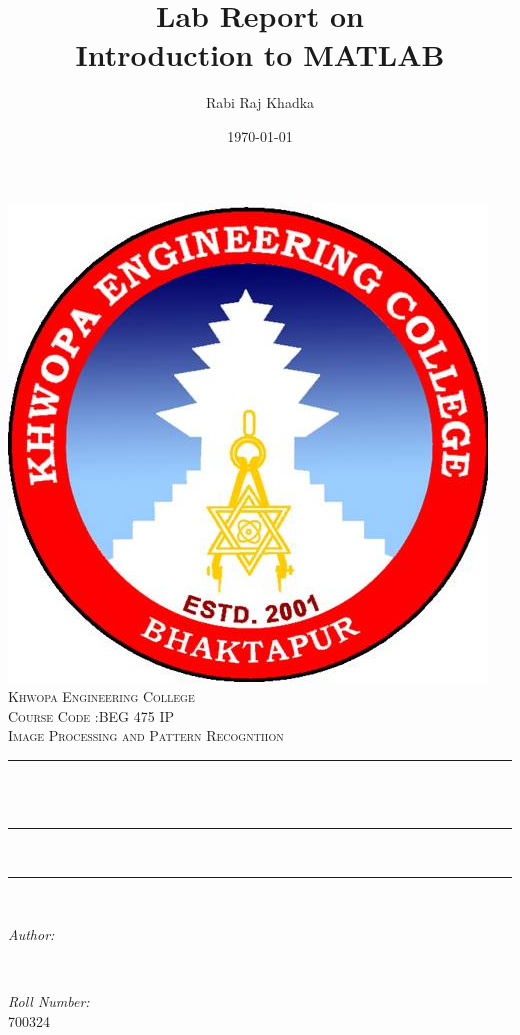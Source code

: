 \documentclass[12pt]{article}
\title{Lab Report on \\Introduction to MATLAB }								%
\author{Rabi Raj Khadka }								%
\date{\today}											%
\makeatletter
\let\thetitle\@title
\let\theauthor\@author
\let\thedate\@date
\makeatother
\begin{document}

\begin{titlepage}
	\centering
    \vspace*{0.2 cm}
    \includegraphics[scale = 0.3]{kheclogo.jpg}\\[1.0 cm]	%
    \textsc{\LARGE Khwopa Engineering College}\\[2.0 cm]	%
	\textsc{\Large Course Code :BEG 475 IP}\\[0.5 cm]				%
	\textsc{\large Image Processing and Pattern Recogntiion}\\[0.5 cm]				%
	\rule{\linewidth}{0.2 mm} \\[0.4 cm]
	{ \huge \bfseries \thetitle}\\
	\rule{\linewidth}{0.2 mm} \\[1.0 cm]
	
	\rule{\linewidth}{0 mm} \\[1.0 cm]

	\begin{minipage}{0.4\textwidth}
		\begin{flushleft} \large
			\emph{Author:}\\
			\theauthor
			\end{flushleft}
			\end{minipage}~
			\begin{minipage}{0.4\textwidth}
			\begin{flushright} \large
			\emph{Roll  Number:} \\
			700324									%
		\end{flushright}
	\end{minipage}\\[2 cm]
	
	{\large \thedate}\\[2 cm]
 
	\vfill
	
\end{titlepage}
\end{document}
